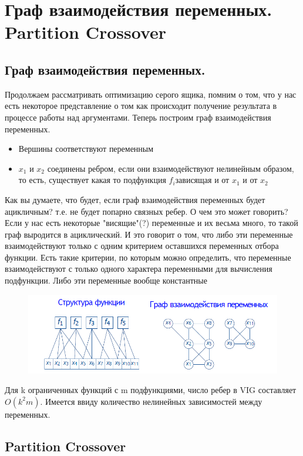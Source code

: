 \section{Граф взаимодействия переменных. Partition Crossover}
\subsection{Граф взаимодействия переменных.}
Продолжаем рассматривать оптимизацию серого ящика, помним о том, что у нас есть некоторое представление о том как происходит получение результата в процессе работы над аргументами. Теперь построим граф взаимодействия переменных.
\begin{itemize}
    \item Вершины соответствуют переменным
    \item $x_1$ и $x_2$ соединены ребром, если они взаимодействуют нелинейным образом, то есть, существует какая то подфункция $f_i $зависящая и от $x_1$ и от $x_2$
\end{itemize}
Как вы думаете, что будет, если граф взаимодействия переменных будет ацикличным? т.е. не будет попарно связных ребер. О чем это может говорить?\\
Если у нас есть некоторые "висящие"(?) переменные и их весьма много, то такой граф выродится в ациклический. И это говорит о том, что либо эти переменные взаимодействуют только с одним критерием оставшихся переменных отбора функции. Есть такие критерии, по которым можно определить, что переменные взаимодействуют с только одного характера переменными для вычисления подфункции. Либо эти переменные вообще константные\\
\begin{figure}[h]
\centering
\includegraphics[width=0.8\linewidth]{images/graf.PNG}
\end{figure}
Для k ограниченных функций с m подфункциями, число ребер в VIG составляет $O(k^2m)$. Имеется ввиду количество нелинейных зависимостей между переменных.
\subsection{Partition Crossover}

